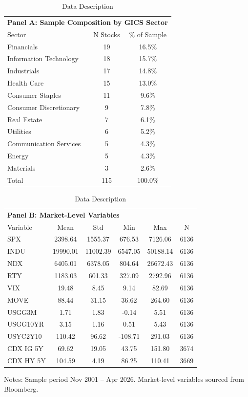 
\begin{table}[htbp]
\centering
\caption{Data Description}
\label{tab:data_description}
\small
\begin{tabular}{lcc}
\toprule
\multicolumn{3}{l}{\textbf{Panel A: Sample Composition by GICS Sector}} \\
Sector & N Stocks & \% of Sample \\
\midrule
Financials & 19 & 16.5\% \\
Information Technology & 18 & 15.7\% \\
Industrials & 17 & 14.8\% \\
Health Care & 15 & 13.0\% \\
Consumer Staples & 11 & 9.6\% \\
Consumer Discretionary & 9 & 7.8\% \\
Real Estate & 7 & 6.1\% \\
Utilities & 6 & 5.2\% \\
Communication Services & 5 & 4.3\% \\
Energy & 5 & 4.3\% \\
Materials & 3 & 2.6\% \\
\midrule
Total & 115 & 100.0\% \\
\bottomrule
\end{tabular}

\vspace{0.5cm}

\begin{tabular}{lccccc}
\toprule
\multicolumn{6}{l}{\textbf{Panel B: Market-Level Variables}} \\
Variable & Mean & Std & Min & Max & N \\
\midrule
SPX & 2398.64 & 1555.37 & 676.53 & 7126.06 & 6136 \\
INDU & 19990.01 & 11002.39 & 6547.05 & 50188.14 & 6136 \\
NDX & 6405.01 & 6378.05 & 804.64 & 26672.43 & 6136 \\
RTY & 1183.03 & 601.33 & 327.09 & 2792.96 & 6136 \\
VIX & 19.48 & 8.45 & 9.14 & 82.69 & 6136 \\
MOVE & 88.44 & 31.15 & 36.62 & 264.60 & 6136 \\
USGG3M & 1.71 & 1.83 & -0.14 & 5.51 & 6136 \\
USGG10YR & 3.15 & 1.16 & 0.51 & 5.43 & 6136 \\
USYC2Y10 & 110.42 & 96.62 & -108.71 & 291.03 & 6136 \\
CDX IG 5Y & 69.62 & 19.05 & 43.75 & 151.80 & 3674 \\
CDX HY 5Y & 104.59 & 4.19 & 86.25 & 110.41 & 3669 \\
\bottomrule
\end{tabular}
\begin{tablenotes}\small
\item Notes: Sample period Nov 2001 -- Apr 2026. Market-level variables sourced from Bloomberg.
\end{tablenotes}
\end{table}

